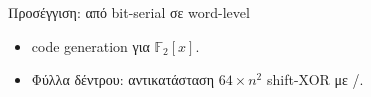 \begin{frame}{Προσέγγιση: από bit-serial σε word-level}
  \begin{itemize}
    \item {}  code generation για $\mathbb{F}_2[x]$.
    \item Φύλλα δέντρου: αντικατάσταση $64\times n^2$ shift-XOR με \clmul/\clmulh.
  \end{itemize}
  \vspace{0.2em}
  \begin{center}
    \resizebox{0.9\linewidth}{!}{}
  \end{center}
\end{frame}
